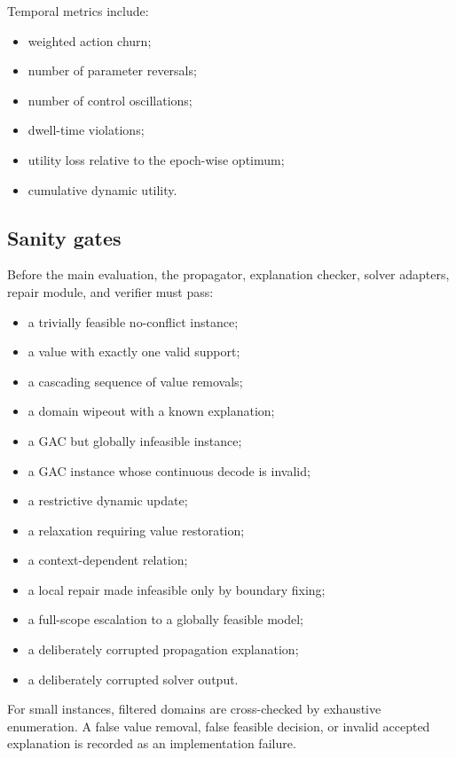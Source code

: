 \documentclass[pdflatex,sn-mathphys-num,iicol,oneside]{sn-jnl}
\begin{document}
Temporal metrics include:

\begin{itemize}
    \item weighted action churn;
    \item number of parameter reversals;
    \item number of control oscillations;
    \item dwell-time violations;
    \item utility loss relative to the epoch-wise optimum;
    \item cumulative dynamic utility.
\end{itemize}

\subsection{Sanity gates}

Before the main evaluation, the propagator, explanation checker,
solver adapters, repair module, and verifier must pass:

\begin{itemize}
    \item a trivially feasible no-conflict instance;
    \item a value with exactly one valid support;
    \item a cascading sequence of value removals;
    \item a domain wipeout with a known explanation;
    \item a GAC but globally infeasible instance;
    \item a GAC instance whose continuous decode is invalid;
    \item a restrictive dynamic update;
    \item a relaxation requiring value restoration;
    \item a context-dependent relation;
    \item a local repair made infeasible only by boundary fixing;
    \item a full-scope escalation to a globally feasible model;
    \item a deliberately corrupted propagation explanation;
    \item a deliberately corrupted solver output.
\end{itemize}

For small instances, filtered domains are cross-checked by exhaustive
enumeration. A false value removal, false feasible decision, or
invalid accepted explanation is recorded as an implementation failure.
\end{document}
